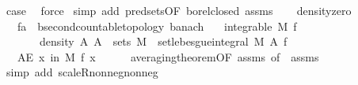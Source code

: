 \begin{isabellebody}
\ {\isacharquery}{\kern0pt}case\ \isamarkupfalse%
\ force\isanewline
{}\isamarkupfalse%
\ {\isacharparenleft}{\kern0pt}simp\ add{\isacharcolon}{\kern0pt}\ pred{\isacharunderscore}{\kern0pt}sets{}{\isacharbrackleft}{\kern0pt}OF\ borel{\isacharunderscore}{\kern0pt}closed{\isacharbrackright}{\kern0pt}\ assms{\isacharparenleft}{\kern0pt}{}{\isacharparenright}{\kern0pt}{\isacharparenright}{\kern0pt}%
\endisatagproof
{\isafoldproof}%
%
\isadelimproof
\isanewline
%
\endisadelimproof
\ \ \isanewline
{}\isamarkupfalse%
\ density{\isacharunderscore}{\kern0pt}zero{\isacharcolon}{\kern0pt}\isanewline
\ \ \ f{\isacharcolon}{\kern0pt}{\isacharcolon}{\kern0pt}{\isachardoublequoteopen}{\isacharprime}{\kern0pt}a\ {\isasymRightarrow}\ {\isacharprime}{\kern0pt}b{\isacharcolon}{\kern0pt}{\isacharcolon}{\kern0pt}{\isacharbraceleft}{\kern0pt}second{\isacharunderscore}{\kern0pt}countable{\isacharunderscore}{\kern0pt}topology{\isacharcomma}{\kern0pt}\ banach{\isacharbraceright}{\kern0pt}{\isachardoublequoteclose}\isanewline
\ \ \ {\isachardoublequoteopen}integrable\ M\ f{\isachardoublequoteclose}\isanewline
\ \ \ \ \ \ \ density{\isacharunderscore}{\kern0pt}{}{\isacharcolon}{\kern0pt}\ {\isachardoublequoteopen}{\isasymAnd}A{\isachardot}{\kern0pt}\ A\ {\isasymin}\ sets\ M\ {\isasymLongrightarrow}\ set{\isacharunderscore}{\kern0pt}lebesgue{\isacharunderscore}{\kern0pt}integral\ M\ A\ f\ {\isacharequal}{\kern0pt}\ {}{\isachardoublequoteclose}\isanewline
\ \ \ {\isachardoublequoteopen}AE\ x\ in\ M{\isachardot}{\kern0pt}\ f\ x\ {\isacharequal}{\kern0pt}\ {}{\isachardoublequoteclose}\isanewline
%
\isadelimproof
\ \ %
\endisadelimproof
%
\isatagproof
{}\isamarkupfalse%
\ averaging{\isacharunderscore}{\kern0pt}theorem{\isacharbrackleft}{\kern0pt}OF\ assms{\isacharparenleft}{\kern0pt}{}{\isacharparenright}{\kern0pt}{\isacharcomma}{\kern0pt}\ of\ {\isachardoublequoteopen}{\isacharbraceleft}{\kern0pt}{}{\isacharbraceright}{\kern0pt}{\isachardoublequoteclose}{\isacharbrackright}{\kern0pt}\ assms{\isacharparenleft}{\kern0pt}{}{\isacharparenright}{\kern0pt}\isanewline
\ \ \isamarkupfalse%
\ {\isacharparenleft}{\kern0pt}simp\ add{\isacharcolon}{\kern0pt}\ scaleR{\isacharunderscore}{\kern0pt}nonneg{\isacharunderscore}{\kern0pt}nonneg{\isacharparenright}{\kern0pt}%
\endisatagproof
{\isafoldproof}%
%
\isadelimproof
%
\endisadelimproof
%
\begin{isamarkuptext}%

\end{isamarkuptext}
\end{isabellebody}
